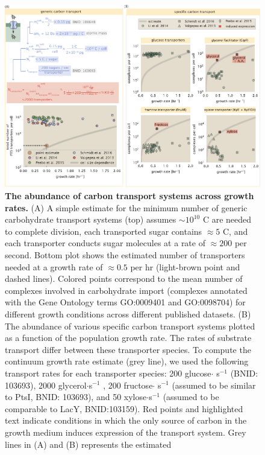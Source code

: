 \begin{figure}
    \begin{fullwidth}
    \includegraphics{main_figs/fig2_carbon_transport.pdf}
    \caption{\textbf{The abundance of carbon transport systems across growth
    rates.} (A) A simple estimate for the minimum number of generic carbohydrate
    transport systems (top) assumes $\sim 10^{10}$ C are needed to complete
    division, each transported sugar contains $\approx 5$ C, and each
    transporter conducts sugar molecules at a rate of $\approx 200$ per second.
    Bottom plot shows the estimated number of transporters needed at a growth
    rate of $\approx 0.5 $ per hr (light-brown point and dashed lines).  Colored
    points correspond to the mean number of complexes involved in carbohydrate
    import (complexes annotated with the Gene Ontology terms GO:0009401 and
    GO:0098704) for different growth conditions across different published
    datasets. (B) The abundance of various specific carbon transport systems
    plotted as a function of the population growth rate. The rates of substrate
    transport differ between these transporter species. To compute the continuum
    growth rate estimate (grey line), we used the following transport rates for
    each transporter species: 200
    glucose$\cdot$ s$^{-1}$ (BNID: 103693),  2000 glycerol$\cdot$s$^{-1}$
    \citep{lu2003}, 200 fructose$\cdot$ s$^{-1}$ (assumed to be similar to PtsI,
    BNID: 103693), and 50 xylose$\cdot$s$^{-1}$ (assumed to be comparable to
    LacY, BNID:103159). Red points and highlighted text indicate conditions in
    which the only source of carbon in the growth medium induces expression of
    the transport system. Grey lines in (A) and (B) represents the estimated
}
\end{fullwidth}
\end{figure}
